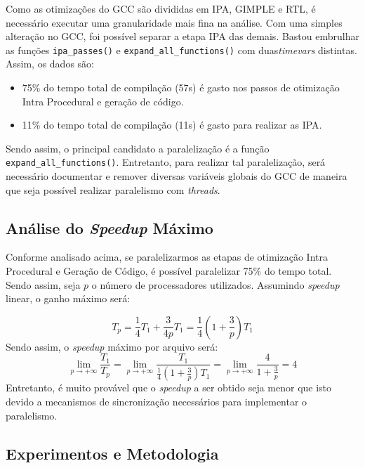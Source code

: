 Como as otimizações do GCC são divididas em IPA, GIMPLE e RTL, é necessário
executar uma granularidade mais fina na análise. Com uma simples alteração
no GCC, foi possível separar a etapa IPA das demais. Bastou embrulhar as funções
\texttt{ipa\_passes()} e \texttt{expand\_all\_functions()} com duas\textit{timevars}
distintas. Assim, os dados são:
\begin{itemize}
    \item 75\% do tempo total de compilação (57s) é gasto nos passos de otimização
        Intra Procedural e geração de código.

    \item 11\% do tempo total de compilação (11s) é gasto para realizar as IPA.
\end{itemize}
Sendo assim, o principal candidato a paralelização é a função \texttt{expand\_all\_functions()}.
Entretanto, para realizar tal paralelização, será necessário documentar e remover diversas
variáveis globais do GCC de maneira que seja possível realizar paralelismo com \textit{threads}.

\subsection{Análise do \textit{Speedup} Máximo}

Conforme analisado acima, se paralelizarmos as etapas de otimização Intra
Procedural e Geração de Código, é possível paralelizar 75\% do tempo total.
Sendo assim, seja $p$ o número de processadores utilizados. Assumindo
\textit{speedup} linear, o ganho máximo será:

$$ T_p = \frac{1}{4} T_1 + \frac{3}{4p}T_1 = \frac{1}{4} \left( 1 + \frac{3}{p}
\right)T_1 $$ Sendo assim, o \textit{speedup} máximo por arquivo será: $$
\lim_{p \rightarrow +\infty} \frac{T_1}{T_p} = \lim_{p \rightarrow +\infty}
\frac{T_1}{\frac{1}{4} \left( 1 + \frac{3}{p} \right)T_1} = \lim_{p \rightarrow
+\infty} \frac{4}{1 + \frac{3}{p}} = 4$$
Entretanto, é muito provável que o \textit{speedup} a ser obtido seja menor que isto
devido a mecanismos de sincronização necessários para implementar o paralelismo.

\subsection{Experimentos e Metodologia}

